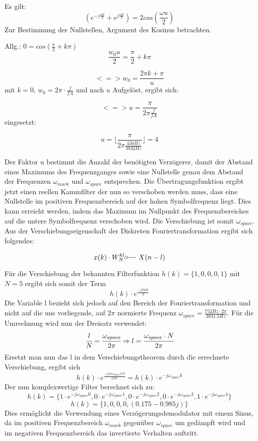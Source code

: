 \documentclass{article}
\begin{document}
Es gilt:
$$
(e^{-j \frac{\omega u}{2}} + e^{j \frac{\omega u}{2}}) = 2  cos(\frac{\omega u}{2})
$$
Zur Bestimmung der Nullstellen, Argument des Kosinus betrachten.

Allg.: $0 = cos(\frac{\pi}{2} + k\pi)$
$$
\frac{w_0 u}{2} = \frac{\pi}{2} + k\pi
$$

$$
<=> w_0 = \frac{2\pi k + \pi}{u}
$$
mit $k = 0$, $w_0 = 2\pi \cdot \frac{f}{fA}$ und nach $u$ Aufgelöst, ergibt sich:

$$
<=> u = \frac{\pi}{2\pi \frac{f}{fA}}
$$
eingesetzt:

$$
u = \lfloor \frac{\pi}{2\pi \frac{450Hz}{3832Hz}}\rfloor = 4
$$

Der Faktor u bestimmt die Anzahl der benötigten Verzögerer, damit der Abstand eines Maximums des Frequenzganges sowie eine Nullstelle genau dem Abstand der Frequenzen $\omega_{mark}$ und $\omega_{space}$ entsprechen. Die Übertragungsfunktion ergibt jetzt einen reellen Kammfilter der nun so verschoben werden muss, dass eine Nullstelle im positiven Frequenzbereich auf der hohen Symbolfrequenz liegt. Dies kann erreicht werden, indem das Maximum im Nullpunkt des Frequenzbereiches auf die untere Symbolfrequenz verschoben wird. Die Verschiebung ist somit $\omega_{space}$.
Aus der Verschiebungseigenschaft der Diskreten Fouriertransformation ergibt sich folgendes:
 
$$
x(k) \cdot W^{kl}_N \fourier X(n-l)
$$

Für die Verschiebung der bekannten Filterfunktion $h(k) = \{1,0,0,0,1\}$ mit $N=5$ ergibt sich somit der Term
$$
h(k) \cdot e^{\frac{-j2\pi{lk}}{N}}
$$
Die Variable l bezieht sich jedoch auf den Bereich der Fouriertransformation und nicht auf die uns vorliegende, auf $2\pi$ normierte Frequenz $\omega_{space} = \frac{752Hz\cdot{2\pi}}{3831.5Hz}$. Für die Umrechnung wird nun der Dreisatz verwendet:
$$
\cfrac{l}{N} = \cfrac{\omega_{space}}{2\pi} \Rightarrow l=\cfrac{\omega_{space} \cdot N}{2\pi}
$$
Ersetzt man nun das l in dem Verschiebungstheorem durch die errechnete Verschiebung, ergibt sich
$$
h(k) \cdot e^{\frac{-j2\pi\omega_{space}kN}{2N\pi}} = h(k) \cdot e^{-j\omega_{space}k}
$$
Der nun komplexwertige Filter berechnet sich zu:
$$
h(k) = \{ 1 \cdot e^{-j\omega_{space}0} , 0 \cdot e^{-j\omega_{space}1} , 0 \cdot e^{-j\omega_{space}2} , 0 \cdot e^{-j\omega_{space}3} , 1 \cdot e^{-j\omega_{space}4}\}
$$
$$
h(k) = \{ 1, 0, 0, 0, (0.175 - 0.985j) \}
$$
Dies ermöglicht die Verwendung eines Verzögerungsdemodulator mit einem Sinus, da im positiven Frequenzbereich $\omega_{mark}$ gegenüber $\omega_{space}$ um gedämpft wird und im negativen Frequenzbereich das invertierte Verhalten auftritt.
\end{document}
